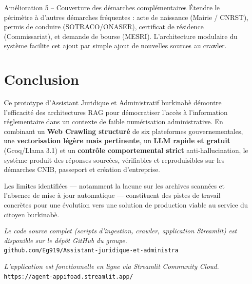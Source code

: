 \documentclass[12pt, a4paper]{article}
\begin{document}
\begin{infobox}{Amélioration 5 – Couverture des démarches complémentaires}
Étendre le périmètre à d'autres démarches fréquentes : acte de naissance (Mairie / CNRST), permis de conduire (SOTRACO/ONASER), certificat de résidence (Commissariat), et demande de bourse (MESRI). L'architecture modulaire du système facilite cet ajout par simple ajout de nouvelles sources au crawler.
\end{infobox}


\section{Conclusion}

Ce prototype d'Assistant Juridique et Administratif burkinabè démontre l'efficacité des architectures RAG pour démocratiser l'accès à l'information réglementaire dans un contexte de faible numérisation administrative. En combinant un \textbf{Web Crawling structuré} de six plateformes gouvernementales, une \textbf{vectorisation légère mais pertinente}, un \textbf{LLM rapide et gratuit} (Groq/Llama 3.1) et un \textbf{contrôle comportemental strict} anti-hallucination, le système produit des réponses sourcées, vérifiables et reproduisibles sur les démarches CNIB, passeport et création d'entreprise.

Les limites identifiées — notamment la lacune sur les archives scannées et l'absence de mise à jour automatique — constituent des pistes de travail concrètes pour une évolution vers une solution de production viable au service du citoyen burkinabè.

\vspace{0.8cm}
\begin{center}
  \begin{tcolorbox}[colback=bfgreen!8, colframe=bfgreen, arc=6pt, width=0.85\textwidth]
    \centering
    \textit{Le code source complet (scripts d'ingestion, crawler, application Streamlit) est disponible sur le dépôt GitHub du groupe.}\\[0.3cm]
    \texttt{\small github.com/Eg919/Assistant-juridique-et-administra}
  \end{tcolorbox}
\end{center}


\vspace{0.8cm}
\begin{center}
  \begin{tcolorbox}[colback=bfgreen!8, colframe=bfgreen, arc=6pt, width=0.85\textwidth]
    \centering
    \textit{ L'application est fonctionnelle en ligne via Streamlit Community Cloud.}\\[0.3cm]
    \texttt{\small https://agent-appifoad.streamlit.app/}
  \end{tcolorbox}
\end{center}
\end{document}
